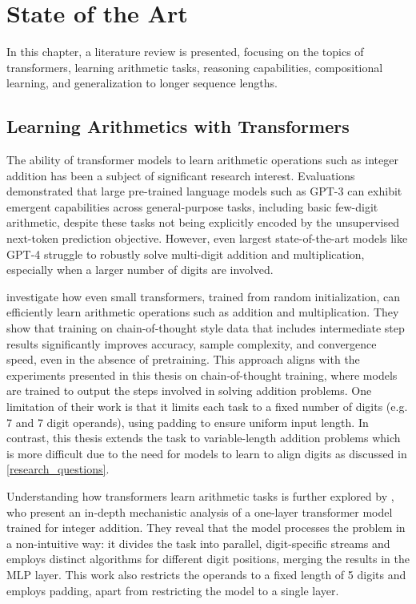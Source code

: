 \chapter{State of the Art}\label{sota}

In this chapter, a literature review is presented, focusing on the topics of transformers, learning arithmetic tasks, reasoning capabilities, compositional learning, and generalization to longer sequence lengths.

\section{Learning Arithmetics with Transformers}\label{sota_arithmetic_tasks}

The ability of transformer models \parencite{vaswani_attention_2017} to learn arithmetic operations such as integer addition has been a subject of significant research interest. Evaluations demonstrated that large pre-trained language models such as GPT-3 \parencite{brown_language_2020} can exhibit emergent capabilities across general-purpose tasks, including basic few-digit arithmetic, despite these tasks not being explicitly encoded by the unsupervised next-token prediction objective. However, even largest state-of-the-art models like GPT-4 \parencite{achiam_gpt-4_2023} struggle to robustly solve multi-digit addition and multiplication, especially when a larger number of digits are involved.

\cite{lee_teaching_2023} investigate how even small transformers, trained from random initialization, can efficiently learn arithmetic operations such as addition and multiplication. They show that training on chain-of-thought style data that includes intermediate step results significantly improves accuracy, sample complexity, and convergence speed, even in the absence of pretraining. This approach aligns with the experiments presented in this thesis on chain-of-thought training, where models are trained to output the steps involved in solving addition problems. One limitation of their work is that it limits each task to a fixed number of digits (e.g. 7 and 7 digit operands), using padding to ensure uniform input length. In contrast, this thesis extends the task to variable-length addition problems which is more difficult due to the need for models to learn to align digits as discussed in \ref{research_questions}.

Understanding how transformers learn arithmetic tasks is further explored by \cite{quirke_understanding_2023}, who present an in-depth mechanistic analysis of a one-layer transformer model trained for integer addition. They reveal that the model processes the problem in a non-intuitive way: it divides the task into parallel, digit-specific streams and employs distinct algorithms for different digit positions, merging the results in the MLP layer. This work also restricts the operands to a fixed length of 5 digits and employs padding, apart from restricting the model to a single layer.

